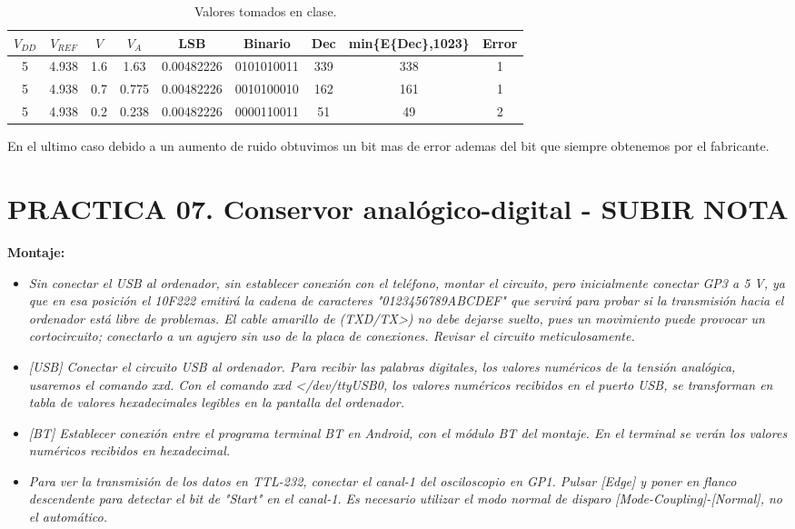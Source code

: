 \documentclass[paper=a4, fontsize=11pt]{scrartcl} %
\numberwithin{equation}{section} %
\numberwithin{figure}{section} %
\numberwithin{table}{section} %
\begin{document}
\begin{table}[H]
	\centering
	\begin{tabular}{|c|c|c|c|c|c|c|c|c|}
		\hline
		\textbf{$ V_{DD} $} & \textbf{$ V_{REF} $} & \textbf{$ V $} & \textbf{$ V_{A} $ } & \textbf{LSB} &  \textbf{Binario} & \textbf{Dec} & \textbf{min\{E\{Dec\},1023\}} & Error \\
		\hline
		5 & 4.938 & 1.6 & 1.63 & 0.00482226 & 0101010011 & 339 & 338 & 1 \\
		\hline
		5 & 4.938 & 0.7 & 0.775 & 0.00482226 & 0010100010 & 162 & 161 & 1 \\
		\hline
		5 & 4.938 & 0.2 & 0.238 & 0.00482226 & 0000110011 & 51 & 49 & 2 \\
		\hline
	\end{tabular}
	\caption{Valores tomados en clase.} \label{medidas}
\end{table}

En el ultimo caso debido a un aumento de ruido obtuvimos un bit mas de error ademas del bit que siempre obtenemos por el fabricante.

\newpage

\section{PRACTICA 07. Conservor analógico-digital - SUBIR NOTA \cite{RV}}


\textbf{Montaje:}

\begin{itemize}
	\item \textit{Sin conectar el USB al ordenador, sin establecer conexión con el teléfono, montar el circuito, pero inicialmente conectar GP3 a 5 V, ya que en esa posición el 10F222 emitirá la cadena de caracteres "0123456789ABCDEF" que servirá para probar si la transmisión hacia el ordenador está libre de problemas. El cable amarillo de (TXD/TX>) no debe dejarse suelto, pues un movimiento puede provocar un cortocircuito; conectarlo a un agujero sin uso de la placa de conexiones. Revisar el circuito meticulosamente.}
	\item \textit{[USB] Conectar el circuito USB al ordenador. Para recibir las palabras digitales, los valores numéricos de la tensión analógica, usaremos el comando xxd. Con el comando xxd </dev/ttyUSB0, los valores numéricos recibidos en el puerto USB, se transforman en tabla de valores hexadecimales legibles en la pantalla del ordenador.}
	\item \textit{[BT] Establecer conexión entre el programa terminal BT en Android, con el módulo BT del montaje.
		En el terminal se verán los valores numéricos recibidos en hexadecimal.}
	\item \textit{Para ver la transmisión de los datos en TTL-232, conectar el canal-1 del osciloscopio en GP1. Pulsar [Edge] y poner en flanco descendente para detectar el bit de "Start" en el canal-1. Es necesario utilizar el modo normal de disparo [Mode-Coupling]-[Normal], no el automático.}
\end{itemize}
\end{document}

